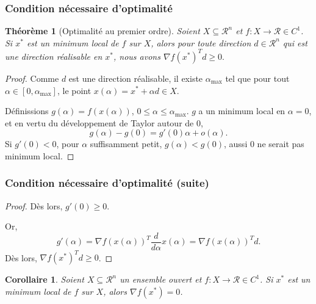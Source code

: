 \documentclass[usepdftitle=false]{beamer}
\newtheorem{thm}{Théorème}
\newtheorem{coro}{Corollaire}
\def\cR{\mathcal{R}}
\begin{document}
\begin{frame}
\frametitle{Condition nécessaire d'optimalité}

\begin{thm}[Optimalité au premier ordre]
Soient $X \subseteq \cR^n$ et $f: X \rightarrow \cR \in C^1$.
Si $x^*$ est un minimum local de $f$ sur $X$, alors pour toute direction $d \in \cR^n$ qui est une direction réalisable en $x^*$, nous avons $\nabla f(x^*)^Td \geq 0.$
\end{thm}

\begin{proof}
Comme $d$ est une direction réalisable, il existe $\alpha_{\max}$ tel que pour tout $\alpha \in [0,\alpha_{\max}]$, le point $x(\alpha) = x^* + \alpha d \in X$.

Définissions $g(\alpha) = f(x(\alpha))$, $0\leq \alpha \leq \alpha_{\max}$. $g$ a un minimum local en $\alpha = 0$, et en vertu du développement de Taylor autour de 0,
$$
g(\alpha) - g(0) = g'(0) \alpha + o(\alpha).
$$
Si $g'(0) < 0$, pour $\alpha$ suffisamment petit, $g(\alpha) < g(0)$, aussi $0$ ne serait pas minimum local.
\end{proof}

\end{frame}

\begin{frame}
\frametitle{Condition nécessaire d'optimalité (suite)}

\begin{proof}
Dès lors, $g'(0) \geq 0$.

Or,
$$
g'(\alpha) = \nabla f(x(\alpha))^T \frac{d}{d\alpha} x(\alpha) = \nabla f(x(\alpha))^T d.
$$
Dès lors, $\nabla f(x^*)^T d \geq 0$.
\end{proof}

\begin{coro}%
	Soient $X \subseteq \cR^n$ un ensemble ouvert et $f: X \rightarrow \cR \in C^1$.
	Si $x^*$ est un minimum local de $f$ sur $X$, alors $\nabla f(x^*) = 0$.
\end{coro}


\end{frame}
\end{document}
